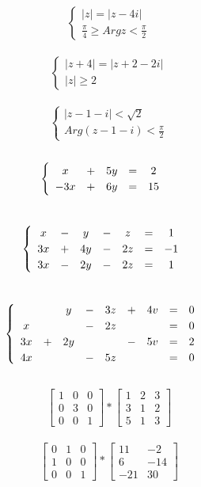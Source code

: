 \documentclass[12pt]{article}
\begin{document}
$$\begin{cases}
|z|=|z-4i| \\
\frac{\pi}{4}\geq Arg z < \frac{\pi}{2}
\end{cases}$$ 
\\
$$\begin{cases}
|z + 4| = |z + 2 - 2i| \\
|z| \geq 2
\end{cases}$$
\\
$$\begin{cases}
|z - 1 - i| < \sqrt{2} \\
Arg(z - 1 - i) < \frac{\pi}{2}
\end{cases}$$
\\
$$\begin{cases}
\begin{array}{c c c c c }
x & + & 5y & = & 2 \\
-3x & + & 6y & = & 15
\end{array}
\end{cases}$$
\\
$$\begin{cases}
\begin{array}{c c c c c c c}
x & - & y & - & z & = & 1\\
3x & + & 4y & - & 2z & = & -1\\
3x & - & 2y & - & 2z & = & 1
\end{array}
\end{cases}$$
\\
$$\begin{cases}
\begin{array}{c c c c c c c c c}
  &  & y & - &3z & + & 4v & = & 0\\
x & & &-& 2z& & &= &0\\
3x & + & 2y & & &-&5v& =& 2\\
4x & & &-& 5z & & &=&0
\end{array}
\end{cases}$$
\\
$$
\begin{bmatrix}
1 & 0 & 0\\
0 & 3 & 0\\
0 & 0 & 1
\end{bmatrix}
*
\begin{bmatrix}
1 & 2 & 3\\
3 & 1 & 2\\
5 & 1 & 3
\end{bmatrix}$$
\\
$$\begin{bmatrix}
0 & 1 & 0\\
1 & 0 & 0\\
0 & 0 & 1
\end{bmatrix}
* 
\begin{bmatrix}
11 & -2\\
6 & -14\\
-21 & 30
\end{bmatrix}$$
\end{document}
